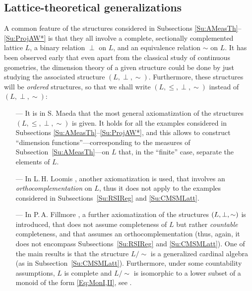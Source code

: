 \documentclass[psamsfonts,reqno]{memo-l}
\theoremstyle{plain}
\theoremstyle{definition}
\theoremstyle{remark}
\numberwithin{equation}{section}
\begin{document}
\subsection{Lattice-theoretical generalizations}\label{Su:LattGen}
A common feature of the structures considered in Subsections
\ref{Su:AMeasTh}--\ref{Su:ProjAW*} is that they all involve a complete,
sectionally complemented lattice $L$,
%
a binary relation $\perp$ on $L$, and
an equivalence relation $\sim$ on $L$. It has been observed early that even
apart from the classical study of continuous
geometries, the dimension theory of a given structure could be done by just
studying the associated structure
$(L,\perp,\sim)$. Furthermore, these structures will be \emph{ordered}
structures, so that we shall write $(L,\leq,\perp,\sim)$ instead of
$(L,\perp,\sim)$:
\begin{itemize}
\item[---] It is in S. Maeda \cite{SMae55} that the most
general axiomatization of the structures $(L,\leq,\perp,\sim)$ is given.
It holds for all the examples considered in Subsections
\ref{Su:AMeasTh}--\ref{Su:ProjAW*}, and this allows to construct ``dimension
functions''---corresponding to the measures of
Subsection~\ref{Su:AMeasTh}---on $L$ that, in the ``finite'' case, separate
the elements of $L$.

\item[---] In L.\,H. Loomis \cite{Loom55}, another
axiomatization is used, that involves an \emph{orthocomplementation} on $L$,
thus it does not apply to the examples considered in
Subsections~\ref{Su:RSIReg} and \ref{Su:CMSMLatt}.

\item[---] In P.\,A. Fillmore \cite{Fill65}, a
further axiomatization of the structures $(L,\perp\nobreak,\sim\nobreak)$ is
introduced, that does not assume completeness of $L$ but rather
\emph{countable} completeness, and that assumes an orthocomplementation
(thus, again, it does not encompass Subsections~\ref{Su:RSIReg} and
\ref{Su:CMSMLatt}). One of the main results is that the structure $L/{\sim}$
is a generalized cardinal algebra (as in Subsection~\ref{Su:CMSMLatt}).
Furthermore, under some countability assumptions, $L$ is complete and
$L/{\sim}$ is isomorphic to a lower subset of a monoid of the form
\eqref{Eq:MonI,II}, see \cite[Theorem~3.12]{Fill65}.
\end{itemize}
\end{document}
